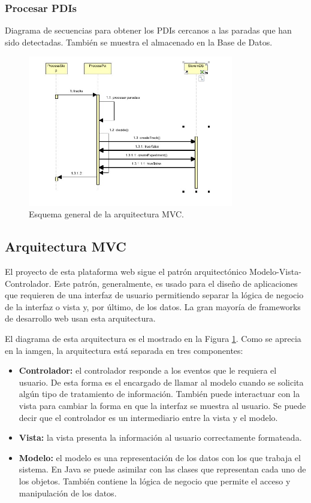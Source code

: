\subsubsection{Procesar PDIs}
Diagrama de secuencias para obtener los PDIs cercanos a las paradas que han sido detectadas. También se muestra el almacenado en la Base de Datos.
\begin{figure}[!htbp]
  \centering
    \includegraphics[width=0.8\textwidth]{../img/diagramas/secuencias/10.jpg}
  \caption{Esquema general de la arquitectura MVC.}
  \label{mvc}
\end{figure}


\subsection{Arquitectura MVC}

El proyecto de esta plataforma web sigue el patrón arquitectónico Modelo-Vista-Controlador. Este patrón, generalmente, es usado para el diseño de aplicaciones que requieren de una interfaz de usuario permitiendo separar la lógica de negocio de la interfaz o vista y, por último, de los datos. La gran mayoría de frameworks de desarrollo web usan esta arquitectura.

El diagrama de esta arquitectura es el mostrado en la Figura \ref{mvc}. Como se aprecia en la iamgen, la arquitectura está separada en tres componentes:

\begin{itemize}
	\item \textbf{Controlador:} el controlador responde a los eventos que le requiera el usuario. De esta forma es el encargado de llamar al modelo cuando se solicita algún tipo de tratamiento de información. También puede interactuar con la vista para cambiar la forma en que la interfaz se muestra al usuario. Se puede decir que el controlador es un intermediario entre la vista y el modelo.
	\item \textbf{Vista:} la vista presenta la información al usuario correctamente formateada.
	\item \textbf{Modelo:} el modelo es una representación de los datos con los que trabaja el sistema. En Java se puede asimilar con las clases que representan cada uno de los objetos. También contiene la lógica de negocio que permite el acceso y manipulación de los datos.
\end{itemize}


